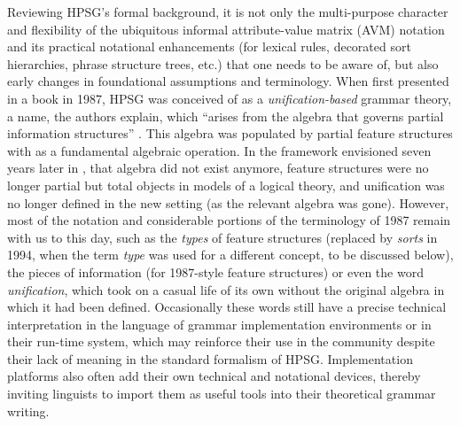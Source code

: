 \documentclass[output=paper,biblatex,babelshorthands,newtxmath,draftmode,colorlinks,citecolor=brown]{langscibook}
\begin{document}
Reviewing\label{formal:page-unification-start} HPSG's formal background,
it is not only the multi-purpose character and flexibility of the ubiquitous informal attribute-value matrix (AVM) notation and its
practical notational enhancements (for lexical rules, decorated sort
hierarchies, phrase structure trees, etc.) that one needs to be
aware of, but also early changes in
foundational assumptions and terminology.
When first presented in a book in 1987, HPSG was conceived of as a
\emph{unification-based} grammar theory, a name, the authors
explain, which ``arises from the algebra that governs partial
information structures'' \citep[7]{PollardSag1987}. This algebra was
populated by partial feature structures with  as a
fundamental algebraic operation. In the framework envisioned seven
years later in \citet{PollardSag1994},
that algebra did not exist anymore, feature structures were no longer
partial but total objects in models of a logical theory, and
unification was no longer defined in the new setting (as the relevant
algebra was gone). However, most of the notation and considerable
portions of the terminology of 1987 remain with us to this day, such as the
\emph{types} of feature structures (replaced by
\emph{sorts} in 1994,
when the term \emph{type} was used for a different concept, to be
discussed below), the pieces of information (for 1987-style feature
structures) or even the word \emph{unification}, which took on a
casual life of its own without the original algebra in
which it had been defined. Occasionally these words still have a
precise technical interpretation in the language of grammar
implementation environments or in their run-time system, which may
reinforce their use in the community despite their lack of meaning in
the standard formalism of HPSG. Implementation platforms also often add
their own technical and notational devices, thereby
inviting linguists to import them as useful tools into their theoretical grammar
writing.\label{formal:page-unification-end}


\end{document}
